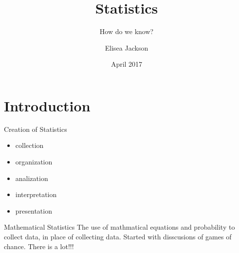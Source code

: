 \documentclass[12pt, aspectratio=169]{beamer}
\title{Statistics}
\subtitle{How do we know?}
\author{Elisea Jackson}
\date{April 2017}
\begin{document}
\begin{frame}
  \titlepage
\end{frame}


\section{Introduction}

\begin{frame}{Creation of Statistics}

\begin{itemize}
  \item collection
  \item organization
  \item analization
  \item interpretation
  \item presentation
\end{itemize}
\end{frame}

\begin{frame}{Mathematical Statistics}
  The use of mathmatical equations and probability to collect data, in place of collecting data. Started with disscusions of games of chance. 
  There is a lot!!!
\end{frame}
\end{document}
